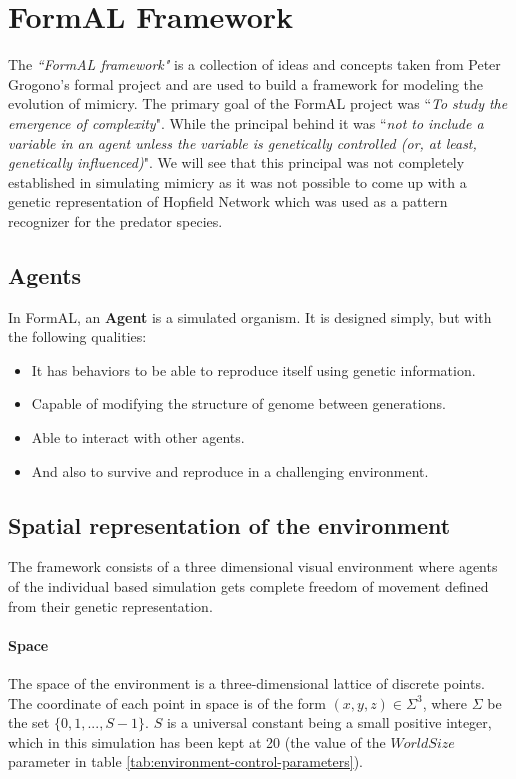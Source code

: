 \section{FormAL Framework}
The \textsl{``FormAL framework"} is a collection of ideas and concepts taken from Peter Grogono's \gls{formal} project \cite{grogono2003} and are used to build a framework for modeling the evolution of mimicry. The primary goal of the FormAL project was ``\textit{To study the emergence of complexity}". While the principal behind it was ``\textit{not to include a variable in an agent unless the variable is genetically controlled (or, at least, genetically influenced)}". We will see that this principal was not completely established in simulating mimicry as it was not possible to come up with a genetic representation of Hopfield Network which was used as a pattern recognizer for the predator species. 

\subsection{Agents}
In FormAL, an \textbf{Agent} is a simulated organism. It is designed simply, but with the following qualities:

\begin{itemize}
	\item It has behaviors to be able to reproduce itself using genetic information.
	\item Capable of modifying the structure of genome between generations.
	\item Able to interact with other agents.
	\item And also to survive and reproduce in a challenging environment.
\end{itemize}

\subsection{Spatial representation of the environment}
The framework consists of a three dimensional visual environment where agents of the individual based simulation gets complete freedom of movement defined from their genetic representation. 

\paragraph{Space}
The space of the environment is a three-dimensional lattice of discrete points. The coordinate of each point in space is of the form \((x,y,z) \in \Sigma^3\), where \(\Sigma\) be the set \(\{0, 1, ..., S-1\}\). \(S\) is a universal constant being a small positive integer, which in this simulation has been kept at 20 (the value of the \(World Size\) parameter in table \ref{tab:environment-control-parameters}). 

